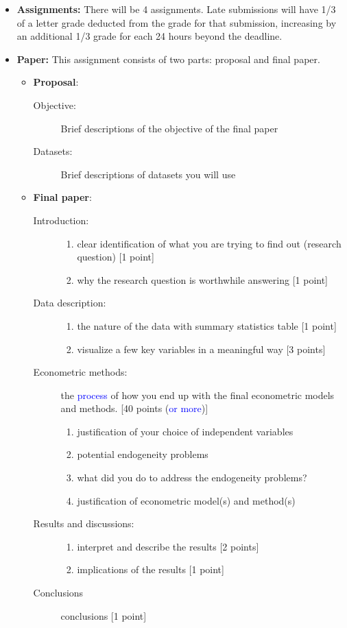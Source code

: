 \documentclass[12pt]{article}
\begin{document}
\begin{itemize}
	\item \textbf{Assignments:} There will be 4 assignments. Late submissions will have 1/3 of a letter grade deducted from the grade for that submission, increasing by an additional 1/3 grade for each 24 hours beyond the deadline.
	\item \textbf{Paper:} This assignment consists of two parts: proposal and final paper. 

	\begin{itemize}
		\item \textbf{Proposal}:
			\begin{description}
			\item [Objective:] Brief descriptions of the objective of the final paper 
			\item [Datasets:] Brief descriptions of datasets you will use 
			\end{description}
		\item \textbf{Final paper}: 	
		\begin{description}
			\item [Introduction:] 
			\begin{enumerate}
				\item clear identification of what you are trying to find out (research question) [1 point]
				\item why the research question is worthwhile answering [1 point]
			\end{enumerate}
			\item [Data description:] 
			\begin{enumerate}
				\item the nature of the data with summary statistics table [1 point]
				\item visualize a few key variables in a meaningful way [3 points]
			\end{enumerate}
			\item [Econometric methods:] the \textcolor{blue}{process} of how you end up with the final econometric models and methods. [40 points (\textcolor{blue}{or more})]   
			\begin{enumerate}
				\item justification of your choice of independent variables 
				\item potential endogeneity problems 
				\item what did you do to address the endogeneity problems?
				\item justification of econometric model(s) and method(s)
			\end{enumerate}
			\item [Results and discussions:] 
				\begin{enumerate}
					\item interpret and describe the results [2 points]
					\item implications of the results [1 point]
				\end{enumerate}
			\item [Conclusions] conclusions [1 point]
		\end{description}
	\end{itemize}


\end{itemize}
\end{document}
